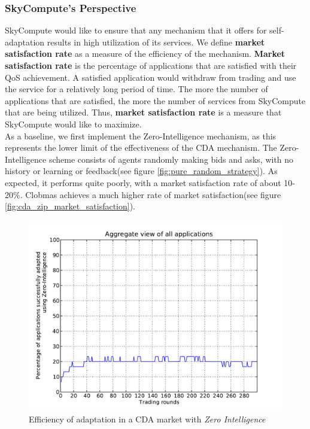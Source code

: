 \documentclass[10pt,journal,compsoc]{IEEEtran}
\begin{document}
\subsubsection{SkyCompute's Perspective}	
SkyCompute would like to ensure that any mechanism that it offers for self-adaptation results in high utilization of its services. We define \textbf{market satisfaction rate} as a measure of the efficiency of the mechanism. \textbf{Market satisfaction rate} is the percentage of applications that are satisfied with their QoS achievement. A satisfied application would withdraw from trading and use the service for a relatively long period of time. The more the number of applications that are satisfied, the more the number of services from SkyCompute that are being utilized. Thus, \textbf{market satisfaction rate} is a measure that SkyCompute would like to maximize.\\
As a baseline, we first implement the Zero-Intelligence mechanism, as this represents the lower limit of the effectiveness of the CDA mechanism. The Zero-Intelligence scheme consists of agents randomly making bids and asks, with no history or learning or feedback(see figure \ref{fig:pure_random_strategy}). As expected, it performs quite poorly, with a market satisfaction rate of about 10-20\%. Clobmas achieves a much higher rate of market satisfaction(see figure \ref{fig:cda_zip_market_satisfaction}). 

\begin{figure}[h]
	\centering
    \includegraphics[scale=0.45, clip, trim=0cm 1cm 1cm 0.8cm]{graphs/efficiency-of-zi.pdf}
    \caption{Efficiency of adaptation in a CDA market with \textit{Zero Intelligence}\label{fig:cda_zi_market_satisfaction}}
\end{figure}
\end{document}
